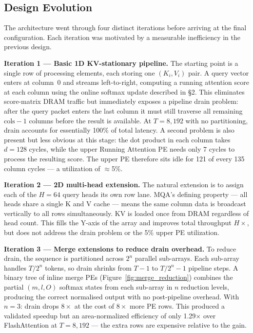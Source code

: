 \documentclass[11pt]{article}
\begin{document}
\subsection{Design Evolution}

The architecture went through four distinct iterations before
arriving at the final configuration.
Each iteration was motivated by a measurable inefficiency in
the previous design.

\textbf{Iteration 1 --- Basic 1D KV-stationary pipeline.}
The starting point is a single row of processing elements,
each storing one \((K_i, V_i)\) pair.
A query vector enters at column~0 and streams left-to-right,
computing a running attention score at each column using the
online softmax update described in \S2.
This eliminates score-matrix DRAM traffic but immediately
exposes a pipeline drain problem: after the query packet enters
the last column it must still traverse all remaining
\(\text{cols} - 1\) columns before the result is available.
At \(T = 8{,}192\) with no partitioning, drain accounts for
essentially 100\% of total latency.
A second problem is also present but less obvious at this stage:
the dot product in each column takes \(d = 128\) cycles,
while the upper Running Attention PE needs only 7 cycles to
process the resulting score.
The upper PE therefore sits idle for 121 of every 135 column
cycles --- a utilization of \(\approx\)5\%.

\textbf{Iteration 2 --- 2D multi-head extension.}
The natural extension is to assign each of the \(H = 64\)
query heads its own row lane.
MQA's defining property --- all heads share a single K and V
cache --- means the same column data is broadcast vertically
to all rows simultaneously.
KV is loaded once from DRAM regardless of head count.
This fills the Y-axis of the array and improves total throughput
\(H\times\), but does not address the drain problem or the
5\% upper PE utilization.

\textbf{Iteration 3 --- Merge extensions to reduce drain overhead.}
To reduce drain, the sequence is partitioned across \(2^n\)
parallel sub-arrays.
Each sub-array handles \(T / 2^n\) tokens, so drain shrinks
from \(T - 1\) to \(T / 2^n - 1\) pipeline steps.
A binary tree of inline merge PEs (Figure~\ref{fig:merge_reduction})
combines the partial \((m, l, O)\) softmax states from each
sub-array in \(n\) reduction levels, producing the correct
normalised output with no post-pipeline overhead.
With \(n = 3\): drain drops \(8\times\) at the cost of
\(8\times\) more PE rows.
This produced a validated speedup but an area-normalized
efficiency of only 1.29$\times$ over FlashAttention at
\(T = 8{,}192\) --- the extra rows are expensive relative
to the gain.
\end{document}
